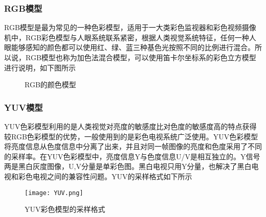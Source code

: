 \documentclass[UTF8,a4paper,10pt]{ctexart}
\begin{document}
\begin{flushleft}
        \subsubsection{RGB模型}
        \hspace{2em}RGB模型是最为常见的一种色彩模型，适用于一大类彩色监视器和彩色视频摄像机中，RGB彩色模型与人眼系统联系紧密，根据人类视觉系统特征，任何一种人眼能够感知的颜色都可以使用红、绿、蓝三种基色光按照不同的比例进行混合。所以说，RGB模型也称为加色法混合模型，可以使用笛卡尔坐标系的彩色立方模型进行说明，如下图所示
        \begin{figure}[htbp]
            \centering
            \caption{RGB的颜色模型}
            \label{fig:fig_rgb_axis}
        \end{figure}
        \subsubsection{YUV模型}
        \hspace{2em}YUV色彩模型利用的是人类视觉对亮度的敏感度比对色度的敏感度高的特点获得较RGB色彩模型的优势，一般使用到的是彩色电视系统广泛使用。YUV色彩模型将亮度信息从色度信息中分离了出来，并且对同一帧图像的亮度和色度采用了不同的采样率。在YUV色彩模型中，亮度信息Y与色度信息U/V是相互独立的。Y信号两是黑白灰度图像，U,V分量是单彩色图。黑白电视只用Y分量，也解决了黑白电视和彩色电视之间的兼容性问题。YUV的采样格式如下所示\\
        \begin{figure}[hbpt]
            \centering
            \texttt{[image: YUV.png]}
            \caption{YUV彩色模型的采样格式}
            \label{fig:fig_YUV}
        \end{figure}


\end{flushleft}
\end{document}
